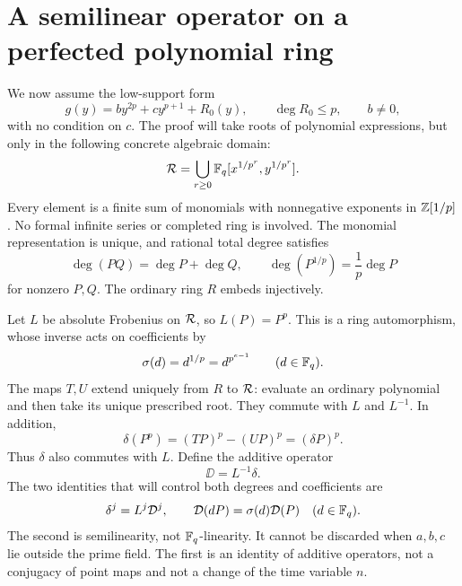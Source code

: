 \section{A semilinear operator on a perfected polynomial ring}\label{sec:perfection}

We now assume the low-support form
\begin{equation}\label{eq:low-g}
 g(y)=by^{2p}+cy^{p+1}+R_0(y),\qquad \deg R_0\le p,
 \qquad b\ne0,
\end{equation}
with no condition on $c$. The proof will take roots of polynomial
expressions, but only in the following concrete algebraic domain:
\begin{equation}\label{eq:perfect-ring}
 \mathcal R=\bigcup_{r\ge0}\mathbb F_q[x^{1/p^r},y^{1/p^r}].
\end{equation}
Every element is a finite sum of monomials with nonnegative
exponents in $\mathbb Z[1/p]$. No formal infinite series or completed
ring is involved. The monomial representation is unique, and
rational total degree satisfies
\[
 \deg(PQ)=\deg P+\deg Q,\qquad
 \deg(P^{1/p})=\frac1p\deg P
\]
for nonzero $P,Q$. The ordinary ring $R$ embeds injectively.

Let $L$ be absolute Frobenius on $\mathcal R$, so $L(P)=P^p$.
This is a ring automorphism, whose inverse acts on coefficients by
\begin{equation}\label{eq:sigma}
 \sigma(d)=d^{1/p}=d^{p^{e-1}}\qquad(d\in\mathbb F_q).
\end{equation}
The maps $T,U$ extend uniquely from $R$ to $\mathcal R$: evaluate an
ordinary polynomial and then take its unique prescribed root.
They commute with $L$ and $L^{-1}$. In addition,
\[
 \delta(P^p)=(TP)^p-(UP)^p=(\delta P)^p.
\]
Thus $\delta$ also commutes with $L$. Define the additive operator
\begin{equation}\label{eq:D-semi}
 \DD=L^{-1}\delta.
\end{equation}
The two identities that will control both degrees and coefficients are
\begin{equation}\label{eq:semi-identities}
 \delta^j=L^j\mathcal D^j,\qquad
 \mathcal D(dP)=\sigma(d)\mathcal D(P)\quad(d\in\mathbb F_q).
\end{equation}
The second is semilinearity, not $\mathbb F_q$-linearity. It cannot be
discarded when $a,b,c$ lie outside the prime field. The first is
an identity of additive operators, not a conjugacy of point maps
and not a change of the time variable $n$.

